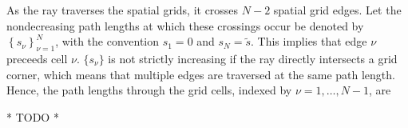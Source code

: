 % 
% 
% 
% 
% 

As the ray traverses the spatial grids, it crosses $N-2$ spatial grid edges.
Let the nondecreasing path lengths at which these crossings occur be denoted by
$\left\{s_\nu\right\}_{\nu=1}^{N}$, with the convention $s_1=0$ and $s_{N}=\tilde{s}$.
This implies that edge $\nu$ preceeds cell $\nu$.
$\{s_\nu\}$ is not strictly increasing if the ray directly intersects a grid corner,
which means that multiple edges are traversed at the same path length.
Hence, the path lengths through the grid cells, indexed by $\nu=1,\ldots,N-1$, are

* TODO *
